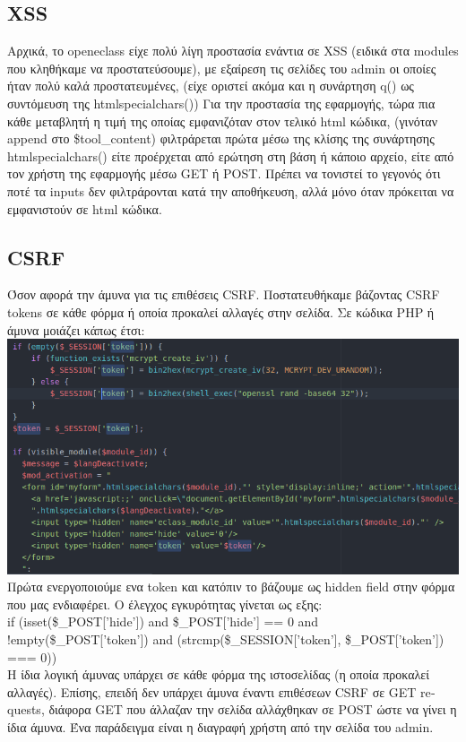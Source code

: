 \documentclass{article}
\begin{document}
\subsection*{\textlatin{XSS}}
Αρχικά, το \textlatin{openeclass} είχε πολύ λίγη προστασία ενάντια σε \textlatin{XSS}
(ειδικά στα \textlatin{modules} που κληθήκαμε να προστατεύσουμε), με εξαίρεση τις σελίδες του
\textlatin{admin} οι οποίες ήταν πολύ καλά προστατευμένες, (είχε οριστεί ακόμα και η συνάρτηση
\textlatin{q()} ως συντόμευση της \textlatin{htmlspecialchars()}) Για την προστασία της εφαρμογής, τώρα πια
κάθε μεταβλητή η τιμή της οποίας εμφανιζόταν στον τελικό \textlatin{html} κώδικα, (γινόταν
\textlatin{append} στο \textlatin{\$tool\_content}) φιλτράρεται πρώτα μέσω της κλίσης της συνάρτησης
\textlatin{htmlspecialchars()} είτε προέρχεται από ερώτηση στη βάση ή κάποιο αρχείο, είτε από τον χρήστη της
εφαρμογής μέσω \textlatin{GET} ή \textlatin{POST}. Πρέπει να τονιστεί το γεγονός ότι ποτέ τα
\textlatin{inputs} δεν φιλτράρονται κατά την αποθήκευση, αλλά μόνο όταν πρόκειται να εμφανιστούν σε
\textlatin{html} κώδικα.


\subsection*{\textlatin{CSRF}}
Όσον αφορά την άμυνα για τις επιθέσεις \textlatin{CSRF}. Ποστατευθήκαμε βάζοντας \textlatin{CSRF tokens}
σε κάθε φόρμα ή οποία προκαλεί αλλαγές στην σελίδα. Σε κώδικα \textlatin{PHP} ή άμυνα μοιάζει κάπως
έτσι:\\
\includegraphics[scale=0.5]{csrf}\\
Πρώτα ενεργοποιούμε ενα \textlatin{token} και κατόπιν το βάζουμε ως \textlatin{hidden field} στην
φόρμα που μας ενδιαφέρει. Ο έλεγχος εγκυρότητας γίνεται ως εξης:\\
\textlatin{if (isset(\$\_POST['hide']) and \$\_POST['hide'] == 0 and !empty(\$\_POST['token']) and
(strcmp(\$\_SESSION['token'], \$\_POST['token']) === 0))}\\
Η ίδια λογική άμυνας υπάρχει σε κάθε φόρμα της ιστοσελίδας (η οποία προκαλεί αλλαγές).
Επίσης, επειδή δεν υπάρχει άμυνα έναντι επιθέσεων \textlatin{CSRF} σε \textlatin{GET requests}, διάφορα
\textlatin{GET} που άλλαζαν την σελίδα αλλάχθηκαν σε \textlatin{POST} ώστε να γίνει η ίδια άμυνα.
Ένα παράδειγμα είναι η διαγραφή χρήστη από την σελίδα του \textlatin{admin}.
\end{document}
